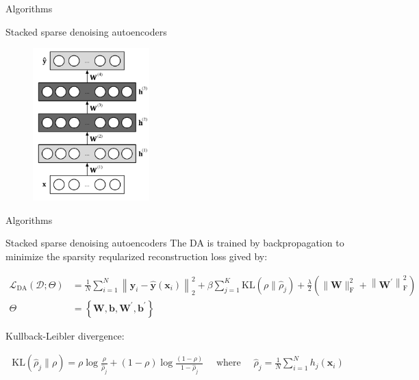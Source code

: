 \documentclass[notes]{beamer}
\begin{document}
\begin{frame}{Algorithms}
	\begin{block}{Stacked sparse denoising autoencoders}
		\begin{figure}
			\includegraphics[width=0.4\textwidth]{1.png}
		\end{figure}
	\end{block}
\end{frame}


\begin{frame}{Algorithms}
	\begin{block}{Stacked sparse denoising autoencoders}
		The DA is trained by backpropagation to minimize the sparsity reqularized reconstruction loss gived by:
		\begin{small}
			\begin{equation}
			\begin{split}
				\mathcal { L } _ { \mathrm { DA } } ( \mathcal { D } ;  \Theta  ) &= \frac { 1 } { N } \sum _ { i = 1 } ^ { N } \left\| \mathbf { y } _ { i } - \hat { \mathbf { y } } \left( \mathbf { x } _ { i } \right) \right\| _ { 2 } ^ { 2 } + \beta \sum _ { j = 1 } ^ { K } \mathrm { KL } ( \rho \| \hat { \rho } _ { j } ) + \frac { \lambda } { 2 } \left( \| \mathbf { W } \| _ { \mathrm { F } } ^ { 2 } + \left\| \mathbf { W } ^ { \prime } \right\| _ { \mathrm { F } } ^ { 2 } \right) \\
				 \Theta& = \left\{ \mathbf { W } , \mathbf { b } , \mathbf { W } ^ { \prime } , \mathbf { b } ^ { \prime } \right\}
			\end{split}
		\end{equation}
		\end{small}
		 Kullback-Leibler divergence:
		 \begin{small}
		 	 \begin{equation}
		 	\begin{split}
		 		\mathrm { KL } \left( \hat { \rho } _ { j } \| \rho \right) = \rho \log \frac { \rho } { \hat { \rho } _ { j } } + ( 1 - \rho ) \log \frac { ( 1 - \rho ) } { 1 - \hat { \rho } _ { j } } \quad \text { where } \quad \hat { \rho } _ { j } = \frac { 1 } { N } \sum _ { i = 1 } ^ { N } h _ { j } \left( \mathbf { x } _ { i } \right)
		 	\end{split}
		 \end{equation}
		 \end{small}
	\end{block}
\end{frame}
\end{document}
